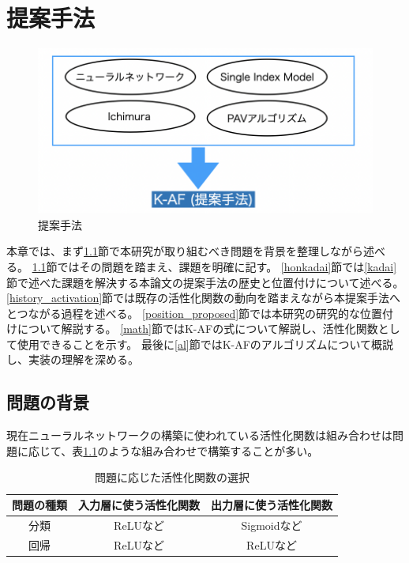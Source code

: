 \chapter{提案手法}
\label{proposed}



\begin{figure}[hbtp]
\includegraphics[width=15cm]{asset/proposed_method.png}
	\caption{提案手法}
	\label{proposed_method}
\end{figure}

本章では、まず\ref{mondai}節で本研究が取り組むべき問題を背景を整理しながら述べる。
\ref{mondai}節ではその問題を踏まえ、課題を明確に記す。
\ref{honkadai}節では\ref{kadai}節で述べた課題を解決する本論文の提案手法の歴史と位置付けについて述べる。
\ref{history_activation}節では既存の活性化関数の動向を踏まえながら本提案手法へとつながる過程を述べる。
\ref{position_proposed}節では本研究の研究的な位置付けについて解説する。
\ref{math}節ではK-AFの式について解説し、活性化関数として使用できることを示す。
最後に\ref{al}節ではK-AFのアルゴリズムについて概説し、実装の理解を深める。




\section{問題の背景}
\label {mondai}


現在ニューラルネットワークの構築に使われている活性化関数は組み合わせは問題に応じて、表\ref{which_to_use}のような組み合わせで構築することが多い。

\begin{table}[htbp]
\label{exp:iris}
    \begin{center}
        \caption{問題に応じた活性化関数の選択}
        \label{which_to_use}
        \vspace{2mm} 
        \begin{tabular}{ |c|c|c| }
        問題の種類 & 入力層に使う活性化関数 & 出力層に使う活性化関数\\
        \hline
        分類  & ReLUなど & Sigmoidなど \\
        \hline
        回帰  & ReLUなど & ReLUなど \\
        \hline
        \end{tabular}
    \end{center}
\end{table}

